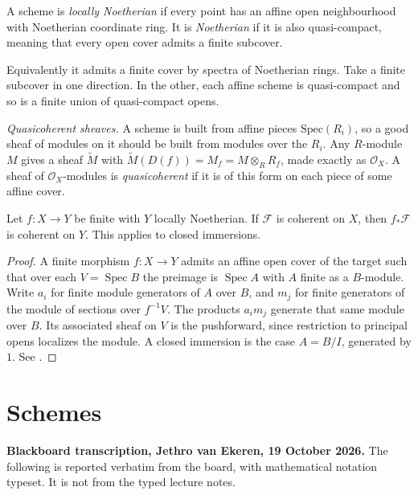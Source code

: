 \begin{definition}
\label{definition-noetherian-scheme}
A scheme is \emph{locally Noetherian} if
every point has an affine open neighbourhood
with Noetherian coordinate ring. It is
\emph{Noetherian} if it is also
quasi-compact, meaning that every open cover
admits a finite subcover.
\end{definition}

Equivalently it admits a finite cover by
spectra of Noetherian rings. Take a finite
subcover in one direction. In the other, each
affine scheme is quasi-compact and so is a
finite union of quasi-compact opens.

\textit{Quasicoherent sheaves.} A scheme is
built from affine pieces
$\mathrm{Spec}(R_i)$, so a good sheaf of
modules on it should be built from modules
over the $R_i$. Any $R$-module $M$ gives a
sheaf $\widetilde{M}$ with
$\widetilde{M}(D(f))=M_f=M\otimes_R R_f$,
made exactly as $\mathcal{O}_X$. A sheaf of
$\mathcal{O}_X$-modules is
\textit{quasicoherent} if it is of this form
on each piece of some affine cover.

\begin{lemma}
\label{lemma-finite-coherent-pushforward}
Let $f:X\to Y$ be finite with $Y$ locally
Noetherian. If $\mathcal F$ is coherent on
$X$, then $f_*\mathcal F$ is coherent on
$Y$. This applies to closed immersions.
\end{lemma}

\begin{proof}
A finite morphism $f:X\to Y$ admits an affine
open cover of the target such that over each
$V=\operatorname{Spec}B$ the preimage is
$\operatorname{Spec}A$ with $A$ finite as a
$B$-module. Write $a_i$ for finite
module generators of $A$ over $B$, and $m_j$
for finite generators of the module of
sections over $f^{-1}V$. The products $a_i
m_j$ generate that same module over $B$. Its
associated sheaf on $V$ is the pushforward,
since restriction to principal opens
localizes the module. A closed immersion is
the case $A=B/I$, generated by $1$. See
\cite[\S30.9]{stacks-project}.
\end{proof}

\section{Schemes}
\label{section-schemes}

{\bf Blackboard transcription, Jethro van Ekeren, 19 October 2026.}
The following is reported verbatim from the board, with mathematical notation typeset.
It is not from the typed lecture notes.

